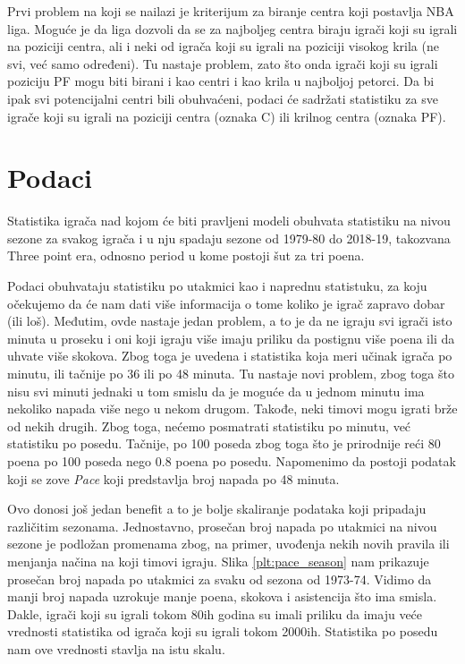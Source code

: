 \documentclass[a4paper]{article}
\begin{document}
	Prvi problem na koji se nailazi je kriterijum za biranje centra koji postavlja
NBA liga. Moguće je da liga dozvoli da se za najboljeg centra biraju igrači koji
su igrali na poziciji centra, ali i neki od igrača koji su igrali na poziciji visokog krila (ne svi, već samo određeni). Tu nastaje problem, zato što onda igrači koji su igrali poziciju PF mogu biti birani i kao centri i kao krila u najboljoj petorci. Da bi ipak svi potencijalni centri bili obuhvaćeni, podaci će sadržati statistiku za sve igrače koji su igrali na poziciji centra (oznaka C) ili krilnog centra (oznaka PF).

\section{Podaci}
\label{sec:podaci}

Statistika igrača nad kojom će biti pravljeni modeli obuhvata statistiku na nivou sezone za svakog igrača i u nju spadaju sezone od 1979-80 do 2018-19, takozvana Three point era, odnosno period u kome postoji šut za tri poena.

Podaci obuhvataju statistiku po utakmici kao i naprednu statistuku, za koju
očekujemo da će nam dati više informacija o tome koliko je igrač zapravo dobar (ili loš). Međutim, ovde nastaje jedan problem, a to je da ne igraju svi igrači isto minuta u proseku i oni koji igraju više imaju priliku da postignu više poena ili da uhvate više skokova. Zbog toga je uvedena i statistika koja meri učinak igrača po minutu, ili tačnije po 36 ili po 48 minuta. Tu nastaje novi problem, zbog toga što nisu svi minuti jednaki u tom smislu da je moguće da u jednom minutu ima nekoliko napada više nego u nekom drugom. Takođe, neki timovi mogu igrati brže od nekih drugih. Zbog toga, nećemo posmatrati statistiku po minutu, već statistiku po posedu. Tačnije, po 100 poseda zbog toga što je prirodnije reći 80 poena po 100 poseda nego 0.8 poena po posedu. Napomenimo da postoji podatak koji se zove \textit{Pace} koji predstavlja broj napada po 48 minuta.

Ovo donosi još jedan benefit a to je bolje skaliranje podataka koji pripadaju različitim sezonama. Jednostavno, prosečan broj napada po utakmici na nivou sezone je podložan promenama zbog, na primer, uvođenja nekih novih pravila ili menjanja načina na koji timovi igraju. Slika \ref{plt:pace_season} nam prikazuje prosečan broj napada po utakmici za svaku od sezona od 1973-74. Vidimo da manji broj napada uzrokuje manje poena, skokova i asistencija što ima smisla. Dakle, igrači koji su igrali tokom 80ih godina su imali priliku da imaju veće vrednosti statistika od igrača koji su igrali tokom 2000ih. Statistika po posedu nam ove vrednosti stavlja na istu skalu.
\end{document}
